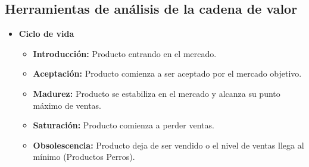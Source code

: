\documentclass{templateNote}
\begin{document}
\begin{itemize}
    \subsection{Herramientas de análisis de la cadena de valor}
    \begin{itemize}
        \item \textbf{Ciclo de vida}
        \begin{itemize}
            \item \textbf{Introducción:} Producto entrando en el mercado.
            \item \textbf{Aceptación:} Producto comienza a ser aceptado por el mercado objetivo.
            \item \textbf{Madurez:} Producto se estabiliza en el mercado y alcanza su punto máximo de ventas.
            \item \textbf{Saturación:} Producto comienza a perder ventas.
            \item \textbf{Obsolescencia:} Producto deja de ser vendido o el nivel de ventas llega al mínimo (Productos Perros).
        \end{itemize}
    \end{itemize}

   
\end{itemize}
\end{document}
